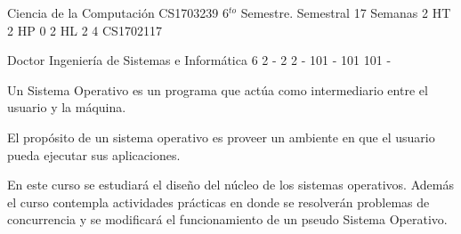 \documentclass[a4paper,8pt]{article}
\begin{document}
\setNombreProfesor{}
\setGradoProfesorAbreviado{}
\sylabusHeader

\academicaTable
{Ciencia de la Computación} %
{CS1703239} %
{6$^{to}$ Semestre.} %
{Semestral} %
{17 Semanas} %
{2 HT} %
{2 HP} %
{0} %
{2 HL}  %
{2} %
{4} %
{CS1702117} %

\administrativaTable
{Doctor} %
{Ingeniería de Sistemas e Informática} %
{6} %
{2} %
{-} %
{2} %
{2} %
{-} %
{101} %
{-} %
{101} %
{101} %
{-} %


\begin{fundamentacion}
Un Sistema Operativo es un programa que actúa como intermediario entre el usuario y la máquina.

El propósito de un sistema operativo es proveer un ambiente en que el usuario pueda ejecutar sus aplicaciones.

En este curso se estudiará el diseño del núcleo de los sistemas operativos.
Además el curso contempla actividades prácticas en donde se resolverán problemas de
concurrencia y se modificará el funcionamiento de un pseudo Sistema Operativo.

\end{fundamentacion}

\begin{sumilla}
\item \OSOverviewofOperatingSystems
\item \OSOperatingSystemPrinciples
\item \OSConcurrency
\item \OSSchedulingandDispatch
\item \OSMemoryManagement
\item \OSSecurityandProtection
\item \OSVirtualMachines
\item \OSDeviceManagement
\item \OSFileSystems
\item \OSRealTimeandEmbeddedSystems
\item \OSFaultTolerance
\item \OSSystemPerformanceEvaluation

\end{sumilla}
\end{document}
